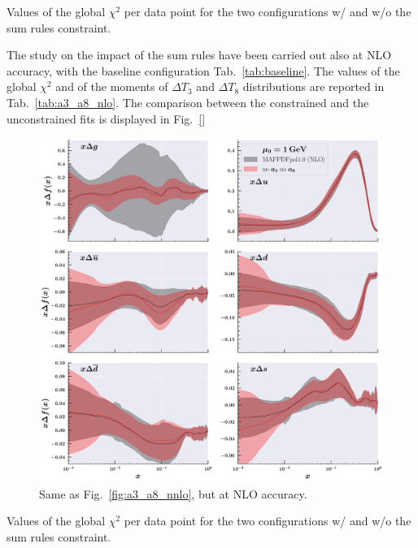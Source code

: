 \begin{table}
  \centering
  \small
  
  \caption{
    \small
    Values of the global $\chi^2$ per data point for the two configurations w/ and w/o the sum rules constraint.
  \label{tab:a3_a8_nnlo}}
\end{table}

The study on the impact of the sum rules have been carried out also at NLO accuracy, with the baseline configuration Tab.~\ref{tab:baseline}. The values of the global $\chi^2$ and of the moments of $\Delta T_3$ and $\Delta T_8$ distributions are reported in Tab.~\ref{tab:a3_a8_nlo}. The comparison between the constrained and the unconstrained fits is displayed in Fig.~\ref{}

\begin{figure}[t!]
  \centering
  \includegraphics[width=\textwidth]{Chapters/Chapter_4/figs/a3_a8_nlo.pdf}
  \caption{\small{Same as Fig.~\ref{fig:a3_a8_nnlo}, but at NLO accuracy.}}
  \label{fig:a3_a8_nlo}
\end{figure}

\begin{table}
  \centering
  \small
  
  \caption{
    \small
    Values of the global $\chi^2$ per data point for the two configurations w/ and w/o the sum rules constraint.
  \label{tab:a3_a8_nlo}}
\end{table}

